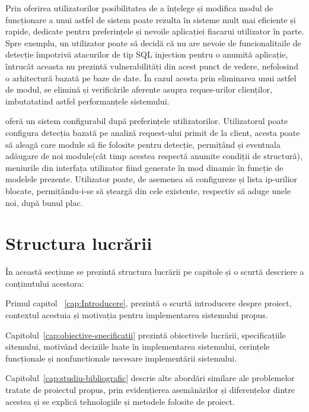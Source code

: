 Prin oferirea utilizatorilor posibilitatea de a înțelege și modifica modul de funcționare a unui astfel de sistem poate rezulta în sisteme mult mai eficiente și rapide, dedicate pentru preferințele și nevoile aplicației fiacarui utilizator în parte. Spre exemplu, un utilizator poate să decidă că nu are nevoie de funcionalitaile de detecție împotrivă atacurilor de tip SQL injection pentru o anumită aplicație, întrucât aceasta nu prezintă vulnerabilități din acest punct de vedere, nefolosind o arhitectură bazată pe baze de date. În cazul acesta prin eliminarea unui astfel de modul, se elimină și verificările aferente asupra reques-urilor clienților, imbutatatind astfel performanțele sistemului. 

\textit{\thesistitle}  oferă un sistem configurabil după preferințele utilizatorilor. Utilizatorul poate configura detecția bazată pe analiză request-ului primit de la client, acesta poate să aleagă care module să fie folosite pentru detecție, permițând și eventuala adăugare de noi module(cât timp acestea respectă anumite condiții de structură), meniurile din interfața utilizator fiind generate în mod dinamic în funcție de modelele prezente. Utilizator poate, de asemenea să configureze și lista ip-urilior blocate, permițându-i-se să șteargă din cele existente, respectiv să aduge unele noi, după bunul plac. 



 \section{Structura lucrării}
În această secțiune se prezintă structura lucrării pe capitole și o scurtă descriere a conținutului acestora: 

Primul capitol ~\ref{cap:Introducere},  prezintă o scurtă introducere despre proiect, contextul acestuia și motivația pentru implementarea sistemului propus. 

Capitolul~\ref{cap:obiective-specificatii}  prezintă obiectivele lucrării, specificațiile sitemului, motivând deciziile luate în implementarea sistemului, cerințele funcționale și nonfunctionale necesare implementării sistemului. 

Capitolul~\ref{cap:studiu-bibliografic}  descrie alte abordări similare ale problemelor tratate de proiectul propus, prin evidențierea asemănărilor și diferențelor dintre acestea și se explică tehnologiile și metodele folosite de proiect. 
 
